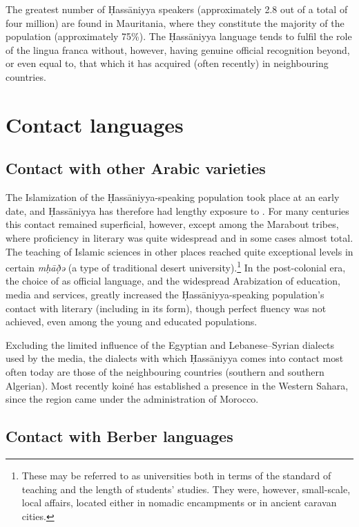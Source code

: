 \documentclass[output=paper]{langsci/langscibook}
\begin{document}
The greatest number of Ḥassāniyya speakers (approximately 2.8 out of a total of four million) are found in Mauritania, where they constitute the majority of the population (approximately 75\%). The Ḥassāniyya language tends to fulfil the role of the lingua franca without, however, having genuine official recognition beyond, or even equal to, that which it has acquired (often recently) in neighbouring countries.

\section{Contact languages} %

\subsection{Contact with other Arabic varieties} %

The Islamization of the Ḥassāniyya-speaking population took place at an early date, and Ḥassāniyya has therefore had lengthy exposure to  . For many centuries this contact remained superficial, however, except among the Marabout tribes, where proficiency in literary  was quite widespread and in some cases almost total. The teaching of Islamic sciences in other places reached quite exceptional levels in certain \textit{mḥāð̣ə{\R}} (a type of traditional desert university).\footnote{These may be referred to as universities both in terms of the standard of teaching and the length of students’ studies. They were, however, small-scale, local affairs, located either in nomadic encampments or in ancient caravan cities.} In the post-{colonial} era, the choice of  as official language, and the widespread {Arabization} of education, media and services, greatly increased the Ḥassāniyya-speaking population’s contact with literary  (including in its  form), though perfect fluency was not achieved, even among the young and educated populations. 

Excluding the limited influence of the Egyptian and {Lebanese}–{Syrian} dialects used by the media, the  dialects with which Ḥassāniyya comes into contact most often today are those of the neighbouring countries (southern  and southern Algerian). Most recently  koiné  has established a presence in the Western Sahara, since the region came under the administration of Morocco.

\subsection{Contact with Berber languages} %
\end{document}
